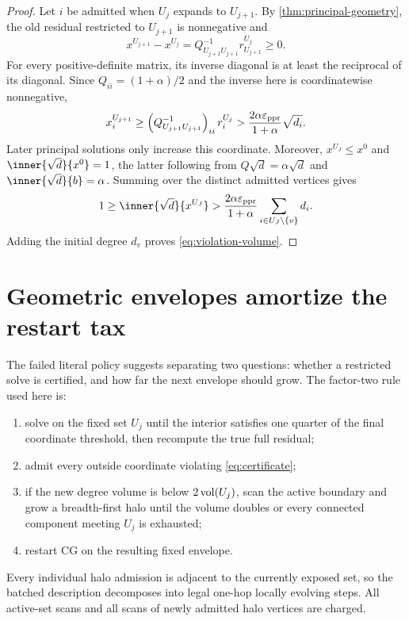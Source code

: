 \documentclass[11pt]{article}
\begin{document}
\begin{proof}
Let $i$ be admitted when $U_j$ expands to $U_{j+1}$. By
\cref{thm:principal-geometry}, the old residual restricted to $U_{j+1}$ is
nonnegative and
\begin{equation*}
 x^{U_{j+1}}-x^{U_j}
 =Q_{U_{j+1}U_{j+1}}^{-1}r^{U_j}_{U_{j+1}}\geq0.
\end{equation*}
For every positive-definite matrix, its inverse diagonal is at least the
reciprocal of its diagonal. Since $Q_{ii}=(1+\alpha)/2$ and the inverse here
is coordinatewise nonnegative,
\begin{equation*}
 x^{U_{j+1}}_i
 \geq\left(Q_{U_{j+1}U_{j+1}}^{-1}\right)_{ii}r^{U_j}_i
 >\frac{2\alpha\varepsilon_{\mathrm{ppr}}}{1+\alpha}\sqrt{d_i}.
\end{equation*}
Later principal solutions only increase this coordinate. Moreover,
$x^{U_J}\leq x^0$ and
$\inner{\sqrt d}{x^0}=1$, the latter following from
$Q\sqrt d=\alpha\sqrt d$ and $\inner{\sqrt d}{b}=\alpha$.
Summing over the distinct admitted vertices gives
\begin{equation*}
 1\geq\inner{\sqrt d}{x^{U_J}}
 >\frac{2\alpha\epsppr}{1+\alpha}
   \sum_{i\in U_J\setminus\{v\}}d_i.
\end{equation*}
Adding the initial degree $d_v$ proves \cref{eq:violation-volume}.
\end{proof}

\section{Geometric envelopes amortize the restart tax}
\label{sec:geometric-envelope}

The failed literal policy suggests separating two questions: whether a
restricted solve is certified, and how far the next envelope should grow.
The factor-two rule used here is:
\begin{enumerate}[leftmargin=*]
 \item solve on the fixed set $U_j$ until the interior satisfies one quarter
 of the final coordinate threshold, then recompute the true full residual;
 \item admit every outside coordinate violating \cref{eq:certificate};
 \item if the new degree volume is below $2\operatorname{vol}(U_j)$, scan the active
 boundary and grow a breadth-first halo until the volume doubles or every
 connected component meeting $U_j$ is exhausted;
 \item restart CG on the resulting fixed envelope.
\end{enumerate}
Every individual halo admission is adjacent to the currently exposed set, so
the batched description decomposes into legal one-hop locally evolving steps.
All active-set scans and all scans of newly admitted halo vertices are charged.
\end{document}
